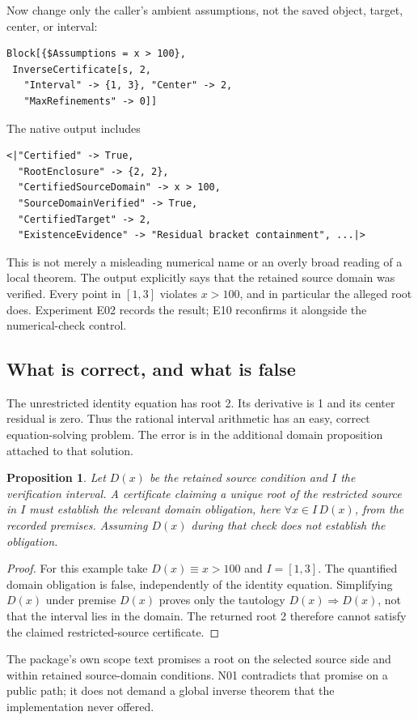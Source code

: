 \documentclass[11pt,a4paper]{article}
\newtheorem{proposition}{Proposition}[section]
\begin{document}
Now change only the caller's ambient assumptions, not the saved object, target, center, or interval:
\begin{lstlisting}
Block[{$Assumptions = x > 100},
 InverseCertificate[s, 2,
   "Interval" -> {1, 3}, "Center" -> 2,
   "MaxRefinements" -> 0]]
\end{lstlisting}
The native output includes
\begin{lstlisting}
<|"Certified" -> True,
  "RootEnclosure" -> {2, 2},
  "CertifiedSourceDomain" -> x > 100,
  "SourceDomainVerified" -> True,
  "CertifiedTarget" -> 2,
  "ExistenceEvidence" -> "Residual bracket containment", ...|>
\end{lstlisting}
This is not merely a misleading numerical name or an overly broad reading of a local theorem. The output explicitly says that the retained source domain was verified. Every point in \([1,3]\) violates \(x>100\), and in particular the alleged root does. Experiment E02 records the result; E10 reconfirms it alongside the numerical-check control.

\subsection{What is correct, and what is false}
The unrestricted identity equation has root 2. Its derivative is 1 and its center residual is zero. Thus the rational interval arithmetic has an easy, correct equation-solving problem. The error is in the additional domain proposition attached to that solution.

\begin{proposition}
Let \(D(x)\) be the retained source condition and \(I\) the verification interval. A certificate claiming a unique root of the restricted source in \(I\) must establish the relevant domain obligation, here \(\forall x\in I\,D(x)\), from the recorded premises. Assuming \(D(x)\) during that check does not establish the obligation.
\end{proposition}
\begin{proof}
For this example take \(D(x)\equiv x>100\) and \(I=[1,3]\). The quantified domain obligation is false, independently of the identity equation. Simplifying \(D(x)\) under premise \(D(x)\) proves only the tautology \(D(x)\Rightarrow D(x)\), not that the interval lies in the domain. The returned root 2 therefore cannot satisfy the claimed restricted-source certificate.
\end{proof}

The package's own scope text promises a root on the selected source side and within retained source-domain conditions. N01 contradicts that promise on a public path; it does not demand a global inverse theorem that the implementation never offered.\cite{repo-cert}
\end{document}
